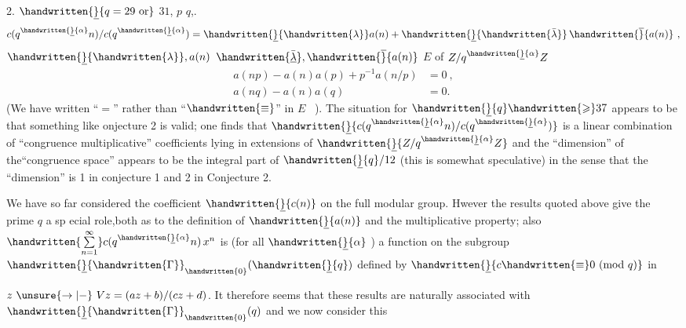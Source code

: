  2. \quad {} $\handwritten{\underline}{q=29\ \text{or}}$ $31$, $p$  $q$,. 
\[
c(q^{\handwritten{\underline}{\alpha}}n)/c(q^{\handwritten{\underline}{\alpha}})=\handwritten{\underline}{\handwritten{\lambda}}a(n)+\handwritten{\underline}{\handwritten{\bar{\lambda}}}\,\handwritten{\overline}{a(n)}\ ,
\]
$\handwritten{\underline}{\handwritten{\lambda}},a(n)$ $\handwritten{\underline{\bar{\lambda}}},\handwritten{\overline}{a(n)}$  $E$ of $Z/q^{\handwritten{\underline}{\alpha}}Z$ 
\[
\begin{aligned}
a(np)-a(n)a(p)+p^{-1}a(n/p)&=0\ ,\\
a(nq)-a(n)a(q)&=0.
\end{aligned}
\]
\margin{\handwritten{\#}}
(We have written ``$=$'' rather than ``$\handwritten{\equiv}$'' in $E$ \ ). The situation for $\handwritten{\underline}{q}\handwritten{\geqslant}37$ appears to be that something like onjecture 2 is valid; one finds that $\handwritten{\underline}{c(q^{\handwritten{\underline}{\alpha}}n)/c(q^{\handwritten{\underline}{\alpha}})}$ is a linear combination of ``congruence multiplicative'' coefficients lying in extensions of $\handwritten{\underline}{Z/q^{\handwritten{\underline}{\alpha}}Z}$ and the ``dimension'' of the``congruence space'' appears to be the integral part of $\handwritten{\underline}{q}/12$ (this is somewhat speculative) in the sense that the ``dimension'' is 1 in conjecture 1 and 2 in Conjecture 2.

We have so far considered the coefficient $\handwritten{\underline}{c(n)}$ on the full modular group. Hwever the results quoted above give the prime $q$ a sp ecial role,both as to the definition of $\handwritten{\underline}{a(n)}$ and the multiplicative property; also $\handwritten{\sum\limits_{n=1}^{\infty}}c(q^{\handwritten{\underline}{\alpha}}n)\,x^{n}$ is (for all $\handwritten{\underline}{\alpha}$ ) a function on the subgroup $\handwritten{\underline}{\handwritten{\Gamma}}_{\handwritten{0}}(\handwritten{\underline}{q})$ defined by $\handwritten{\underline}{c\handwritten{\equiv}0\ (\mathrm{mod}\ q)}$ in

$z\ \unsure{\rightarrow|-}\ Vz=(az+b)/(cz+d)$. It therefore seems that these results are naturally associated with $\handwritten{\underline}{\handwritten{\Gamma}}_{\handwritten{0}}(q)$ and we now consider this


